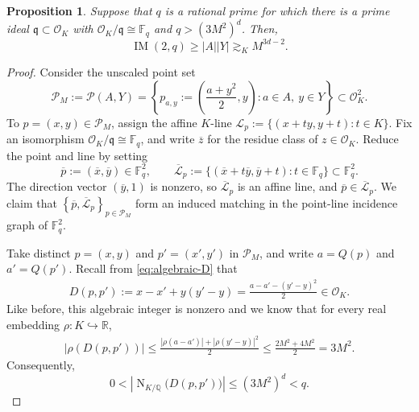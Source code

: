 \documentclass[11pt,reqno]{amsart}
\newtheorem{proposition}[proposition]{Proposition}
\theoremstyle{definition}
\theoremstyle{remark}
\newcommand{\R}{\mathbb{R}}
\newcommand{\Q}{\mathbb{Q}}
\newcommand{\OK}{\mathcal{O}_K}
\newcommand{\Norm}{\operatorname{N}}
\begin{document}
\begin{proposition}
\label{prop:finite-field-reduction}
Suppose that $q$ is a rational prime for which there is a prime ideal
$\mathfrak q\subset\OK$ with $\OK/\mathfrak q\cong\mathbb F_q$ and $q>(3M^2)^d$. Then,
\[
        \operatorname{IM}(2,q)
        \ge |A||Y| \gtrsim_K M^{3d-2}.
\]
\end{proposition}

\begin{proof}
Consider the unscaled point set
\[
        \mathcal P_M
        :=
        \mathcal P(A,Y)
        =
        \left\{
        p_{a,y}
        :=
        \left(\frac{a+y^2}{2},y\right):
        a\in A,\ y\in Y
        \right\}
        \subset\OK^2.
\]
To $p=(x,y)\in\mathcal P_M$, assign the affine $K$-line $\mathcal L_p:= \{(x+ty,y+t):t\in K\}$. Fix an isomorphism $\OK/\mathfrak q\cong\mathbb F_q$, and write
$\overline z$ for the residue class of $z\in\OK$. Reduce the point and
line by setting
\[
        \overline p:=(\overline x,\overline y) \in \mathbb{F}_{q}^{2},
        \qquad
        \overline{\mathcal L}_p
        :=
        \{
        (\overline x+t\overline y,\overline y+t):
        t\in\mathbb F_q
        \} \subset \mathbb{F}_{q}^{2}.
\]
The direction vector $(\overline y,1)$ is nonzero, so
$\overline{\mathcal L}_p$ is an affine line, and
$\overline p\in\overline{\mathcal L}_p$. We claim that $\left\{\overline{p},\overline{\mathcal L}_p\right\}_{p \in \mathcal{P}_{M}}$ form an induced matching in the point-line incidence graph of $\mathbb{F}_{q}^{2}$. 

Take
distinct $p=(x,y)$ and $p'=(x',y')$ in $\mathcal P_M$, and write
$a=Q(p)$ and $a'=Q(p')$. Recall from \eqref{eq:algebraic-D} that
\[
\begin{aligned}
        D(p,p'):=x-x'+y(y'-y)=\frac{a-a'-(y'-y)^2}{2}\in\OK.
\end{aligned}
\]
Like before, this algebraic integer is nonzero and we know that for every real embedding $\rho:K\hookrightarrow\R$,
\[
\begin{aligned}
        |\rho(D(p,p'))| \le \frac{|\rho(a-a')|+|\rho(y'-y)|^2}{2}\le
        \frac{2M^2+4M^2}{2}
        =3M^2.
\end{aligned}
\]
Consequently,
\begin{equation}
\label{eq:finite-field-norm-bound}
        0<
        \left|\Norm_{K/\Q}\bigl(D(p,p')\bigr)\right|
        \le(3M^2)^d
        <q.
\end{equation}


\end{proof}
\end{document}
